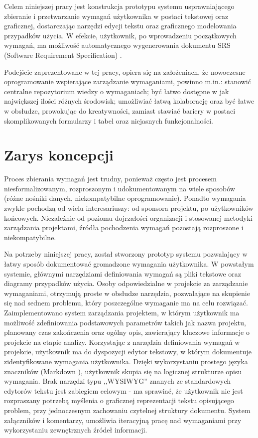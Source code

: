       Celem niniejszej pracy jest konstrukcja prototypu systemu usprawniającego zbieranie i przetwarzanie wymagań użytkownika w postaci tekstowej oraz graficznej, dostarczając narzędzi edycji tekstu oraz graficznego modelowania przypadków użycia. W efekcie, użytkownik, po wprowadzeniu początkowych wymagań, ma możliwość automatycznego wygenerowania dokumentu SRS (Software Requirement Specification) \cite{IEEE89}.
      
      Podejście zaprezentowane w tej pracy, opiera się na założeniach, że nowoczesne oprogramowanie wspierające zarządzanie wymaganiami, powinno m.in.: stanowić centralne repozytorium wiedzy o wymaganiach; być łatwo dostępne w jak największej ilości różnych środowisk; umożliwiać łatwą kolaborację oraz być łatwe w obsłudze, prowokując do kreatywności, zamiast stawiać bariery w postaci skomplikowanych formularzy i tabel oraz niejasnych funkcjonalności. 


    \section{Zarys koncepcji}

      Proces zbierania wymagań jest trudny, ponieważ często jest procesem niesformalizowanym, rozproszonym i udokumentowanym na wiele sposobów (różne nośniki danych, niekompatybilne oprogramowanie). Ponadto wymagania zwykle pochodzą od wielu interesariuszy: od sponsora projektu, po użytkowników końcowych. Niezależnie od poziomu dojrzałości organizacji i stosowanej metodyki zarządzania projektami, źródła pochodzenia wymagań pozostają rozproszone i niekompatybilne. 

      Na potrzeby niniejszej pracy, został stworzony prototyp systemu pozwalający w łatwy sposób dokumentować gromadzone wymagania użytkownika. W powstałym systemie, głównymi narzędziami definiowania wymagań są pliki tekstowe oraz diagramy przypadków użycia. Osoby odpowiedzialne w projekcie za zarządzanie wymaganiami, otrzymują proste w obsłudze narzędzia, pozwalające na skupienie się nad sednem problemu, który poszczególne wymaganie ma na celu rozwiązać. Zaimplementowano system zarządzania projektem, w którym użytkownik ma możliwość zdefiniowania podstawowych parametrów takich jak nazwa projektu, planowany czas zakończenia oraz ogólny opis, zawierający kluczowe informacje o projekcie na etapie analizy. Korzystając z narzędzia definiowania wymagań w projekcie, użytkownik ma do dyspozycji edytor tekstowy, w którym dokumentuje zidentyfikowane wymagania użytkownika. Dzięki wykorzystaniu prostego języka znaczników (Markdown \cite{Grub04}), użytkownik skupia się na logicznej strukturze opisu wymagania. Brak narzędzi typu ,,WYSIWYG'' znanych ze standardowych edytorów tekstu jest zabiegiem celowym - ma sprawiać, że użytkownik nie jest rozpraszany potrzebą myślenia o graficznej reprezentacji tekstu opisującego problem, przy jednoczesnym zachowaniu czytelnej struktury dokumentu. System załączników i komentarzy, umożliwia iteracyjną pracę nad wymaganiami przy wykorzystaniu zewnętrznych źródeł informacji. 

